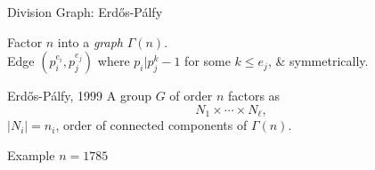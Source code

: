 \documentclass{beamer}
\begin{document}






\begin{frame}{Division Graph: Erd\H{o}s-P\'{a}lfy}

Factor $n$ into a \emph{graph} $\Gamma(n)$.  \\
Edge $(p_i^{e_i},p_j^{e_j})$
where $p_i|p_j^k-1$ for some $k\leq e_j$, \& symmetrically.  

\begin{block}{Erd\H{o}s-P\'{a}lfy, 1999}
    A group $G$ of order $n$ factors as 
\[N_1\times \cdots \times N_{\ell},\] 
$|N_i|=n_i$, order of connected components of $\Gamma(n)$.
\end{block}

\pause

\begin{block}{Example $n=1785$}
\begin{center}
\end{center}
\end{block}


\end{frame}
    
\end{document}
